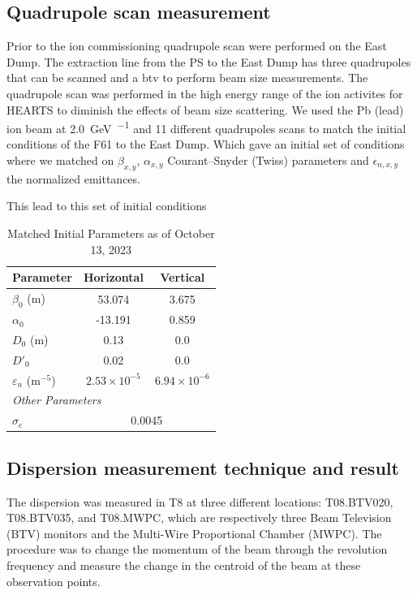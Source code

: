 \documentclass[a4paper,
               ]{jacow}
\begin{document}
\subsection{Quadrupole scan measurement}

Prior to the ion commissioning quadrupole scan were performed on the East Dump. The extraction line from the PS to the East Dump has three quadrupoles that can be scanned and a btv to perform beam size measurements. The quadrupole scan was performed in the high energy range of the ion activites for HEARTS to diminish the effects of beam size scattering. We used the Pb (lead) ion beam at \SI{2.0}{\giga\electronvolt\per\nucleon} and 11 different quadrupoles scans to match the initial conditions of the F61 to the East Dump. Which gave an initial set of conditions where we matched on $\beta_{x,y}$, $\alpha_{x,y}$ Courant–Snyder (Twiss) parameters and $\epsilon_{n,x,y}$ the normalized emittances.

This lead to this set of initial conditions

\begin{table}[h!]
    \centering
    \caption{Matched Initial Parameters as of October 13, 2023}
    \label{tab:initial_conditions}
    \begin{tabular}{l c c}
        \hline
        Parameter & Horizontal & Vertical \\
        \hline
        $\beta_0$ (m) & 53.074 & 3.675 \\
        $\alpha_0$ & -13.191 & 0.859 \\
        $D_0$ (m) & 0.13 & 0.0 \\
        $D'_0$ & 0.02 & 0.0 \\
        $\varepsilon_{n}$ ($\text{m}^{-5}$) & $2.53 \times 10^{-5}$ & $6.94 \times 10^{-6}$ \\
        \hline
        \multicolumn{2}{l}{\textit{Other Parameters}} \\
        \hline
        $\sigma_e$ & \multicolumn{2}{c}{0.0045} \\
        \hline
    \end{tabular}
\end{table}


\subsection{Dispersion measurement technique and result}


The dispersion was measured in T8 at three different locations: T08.BTV020, T08.BTV035, and T08.MWPC, which are respectively three Beam Television (BTV) monitors and the Multi-Wire Proportional Chamber (MWPC). The procedure was to change the momentum of the beam through the revolution frequency and measure the change in the centroid of the beam at these observation points.
\end{document}
